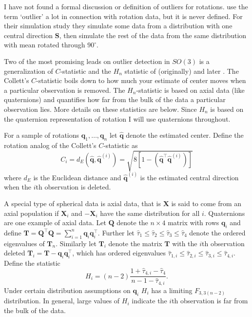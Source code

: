 \documentclass{article}\usepackage{graphicx, color}
\newcommand{\qest}{{\hat{\bm q}}}
\begin{document}
I have not found a formal discussion or definition of outliers for rotations. \cite{fletcher2008} use the term `outlier' a lot in connection with rotation data, but it is never defined.  For their simulation study they simulate some data from a distribution with one central direction $\bm S$, then simulate the rest of the data from the same distribution with mean rotated through $90^\circ$.

Two of the most promising leads on outlier detection in $SO(3)$ is a generalization of \cite{collett1980} $C$-statistic and the $H_n$ statistic of (originally) \cite{best1986} and later \cite{figueiredo2005}.  The Collett's $C$-statistic boils down to how much your estimate of center moves when a particular observation is removed.  The $H_n$-statistic is based on axial data (like quaternions) and quantifies how far from the bulk of the data a particular observation lies.  More details on these statistics are below.  Since $H_n$ is based on the quaternion representation of rotation I will use quaternions throughout. 

For a sample of rotations $\bm q_1,\dots,\bm q_n$ let $\qest$ denote the estimated center.  Define the rotation analog of the Collett's $C$-statistic as 
\begin{equation}\label{eqn:Ci}
C_i=d_E(\qest,\hat{\bm q}^{(i)})=\sqrt{8[1-(\qest^\top\qest^{(i)})]}
\end{equation}
where $d_E$ is the Euclidean distance and $\qest^{(i)}$ is the estimated central direction when the $i$th observation is deleted.  

A special type of spherical data is axial data, that is $\bm X$ is said to come from an axial population if $\bm X_i$ and $-\bm X_i$ have the same distribution for all $i$.  Quaternions are one example of axial data.  Let $\bm Q$ denote the $n\times 4$ matrix with rows $\bm q_i$ and define $\bm T=\bm Q^\top\bm Q=\sum_{i=1}^n\bm q_i\bm q_i^\top$.  Further let $\hat\tau_1\leq\hat\tau_2\leq\hat\tau_3\leq\hat\tau_4$ denote the ordered eigenvalues of $\bm T_n$.  Similarly let $\bm T_{i}$ denote the matrix $\bm T$ with the $i$th observation deleted $\bm T_i=\bm T-\bm q_i\bm q_i^\top$, which has ordered eigenvalues $\hat\tau_{1,i}\leq\hat\tau_{2,i}\leq\hat\tau_{3,i}\leq\hat\tau_{4,i}$.  Define the statistic
\begin{equation}\label{eqn:Hj}
H_i=(n-2)\frac{1+\hat\tau_{4,i}-\hat\tau_4}{n-1-\hat\tau_{4,i}}.
\end{equation}
Under certain distribution assumptions on $\bm q_i$  $H_i$ has a limiting $F_{3,3(n-2)}$ distribution.  In general, large values of $H_i$ indicate the $i$th observation is far from the bulk of the data.
\end{document}
